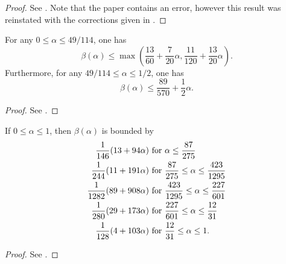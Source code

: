 \literature
{}

\begin{proof}
See \cite[Theorem~3]{huxley_exponential_1991}. Note that the paper contains an error, however this result was reinstated with the corrections given in \cite{huxley_exponential_1993_1}.
\end{proof}



\begin{theorem}\label{beta-Huxley-4} For any $0 \le \alpha \le 49/114$, one has
\[
\beta(\alpha) \le \max\left(\frac{13}{60} + \frac{7}{20}\alpha, \frac{11}{120} + \frac{13}{20}\alpha\right).
\]
Furthermore, for any $49/114 \le \alpha \le 1/2$, one has
\[
\beta(\alpha) \le \frac{89}{570} + \frac{1}{2}\alpha.
\]
\end{theorem}


\literature
{}

\begin{proof}
See \cite[Theorem~1]{huxley_exponential_1993}.
\end{proof}


\begin{theorem}\label{beta-Huxley-4a} If $0 \leq \alpha \leq 1$, then $\beta(\alpha)$ is bounded by
    \begin{align*}
        \frac{1}{146} (13+94\alpha) & \hbox{ for } \alpha \leq \frac{87}{275} \\
        \frac{1}{244} (11+191\alpha) & \hbox{ for } \frac{87}{275} \leq \alpha \leq \frac{423}{1295} \\
        \frac{1}{1282} (89+908\alpha) & \hbox{ for } \frac{423}{1295} \leq \alpha \leq \frac{227}{601} \\
        \frac{1}{280} (29+173\alpha) & \hbox{ for } \frac{227}{601} \leq \alpha \leq \frac{12}{31} \\
        \frac{1}{128} (4+103\alpha) & \hbox{ for } \frac{12}{31} \leq \alpha \leq 1.
    \end{align*}
\end{theorem}


\literature
{}

\begin{proof}
See \cite[Theorem~3]{huxley_exponential_1993}.
\end{proof}


